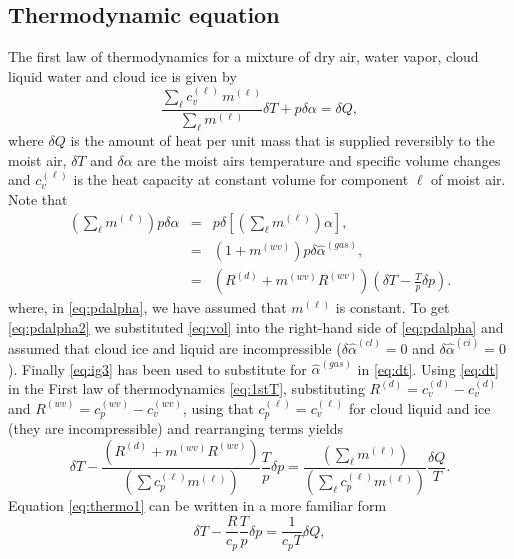 \documentclass{agujournal}
\begin{document}
\subsection{Thermodynamic equation}
The first law of thermodynamics for a mixture of dry air, water vapor, cloud liquid water and cloud ice is given by
\begin{equation}
\frac{\sum_\ell c_{v}^{(\ell)}\, m^{(\ell)}}{\sum_\ell m^{(\ell)}}\delta T+p\delta \alpha=\delta Q,\label{eq:1stT}
\end{equation}
where $\delta Q$ is the amount of heat per unit mass that is supplied reversibly to the moist air, $\delta T$ and $\delta \alpha$ are the moist airs temperature and specific volume changes and $c_v^{(\ell)}$ is the heat capacity at constant volume for component $\ell$ of moist air. Note that
\begin{eqnarray}
\left( \sum_\ell m^{(\ell)}\right)p\delta \alpha &=& p \delta \left[ \left( \sum_\ell m^{(\ell)} \right)\alpha  \right],\label{eq:pdalpha}\\
                                       &=& (1+m^{(wv)})p\delta \hat{\alpha}^{(gas)},\label{eq:pdalpha2}\\
                                       &=& \left(R^{(d)}+m^{(wv)}R^{(wv)}\right)\left(\delta T-\frac{T}{p}\delta p\right)\label{eq:dt}.
\end{eqnarray}
where, in \eqref{eq:pdalpha}, we have assumed that $m^{(\ell)}$ is constant. To get \eqref{eq:pdalpha2} we substituted \eqref{eq:vol} into the right-hand side of \eqref{eq:pdalpha} and assumed that cloud ice and liquid are incompressible ($\delta \hat{\alpha}^{(cl)}=0$ and $\delta \hat{\alpha}^{(ci)}=0$). Finally \eqref{eq:ig3} has been used to substitute for $\hat{\alpha}^{(gas)}$ in \eqref{eq:dt}.
Using \eqref{eq:dt} in the First law of thermodynamics \eqref{eq:1stT}, substituting $R^{(d)}=c_v^{(d)}-c_v^{(d)}$ and $R^{(wv)}=c_p^{(wv)}-c_{v}^{(wv)}$, using that $c_p^{(\ell)}=c^{(\ell)}_v$ for cloud liquid and ice (they are incompressible) and rearranging terms yields
\begin{equation}
\delta T-\frac{\left(R^{(d)}+m^{(wv)}R^{(wv)}\right)}{\left(\sum c_p^{(\ell)}m^{(\ell)}\right)}\frac{T}{p}\delta p=\frac{\left(\sum_\ell m^{(\ell)}\right)}{\left(\sum_\ell c_p^{(\ell)}m^{(\ell)}\right)}\frac{\delta Q}{T}.\label{eq:thermo1}
\end{equation}
Equation \eqref{eq:thermo1} can be written in a more familiar form
\begin{equation}
\delta T-\frac{R}{c_p}\frac{T}{p}\delta p=\frac{1}{c_p T}\delta Q\label{eq:thermo},
\end{equation}
\end{document}
